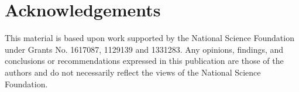 \documentclass[sigconf]{acmart}
\begin{document}



\maketitle



\section{Acknowledgements}

This material is based upon work supported by the National Science Foundation under Grants No. 1617087, 1129139 and 1331283. Any opinions, findings, and conclusions or recommendations expressed in this publication are those of the authors and do not necessarily reflect the views of the National Science Foundation.

 

\end{document}
